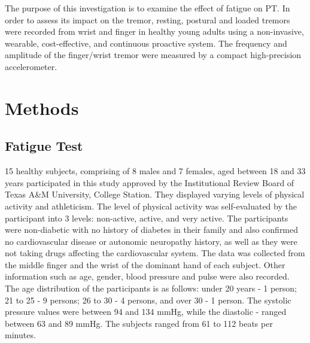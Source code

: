 \documentclass[conference, a4paper]{IEEEtran}
\begin{document}
The purpose of this investigation is to examine the effect of fatigue on PT. In order to assess its impact on the tremor, resting, postural and loaded tremors were  recorded from wrist and finger in healthy young adults using a non-invasive, wearable, cost-effective, and continuous proactive system. The frequency and amplitude of the finger/wrist tremor were measured by a compact high-precision accelerometer.

\section{Methods}
%
\subsection{Fatigue Test}


15 healthy subjects, comprising of 8 males and 7 females, aged between 18 and 33 years participated in this study approved by the Institutional Review Board of Texas A\&M University, College Station. They displayed varying levels of physical activity and athleticism. The level of physical activity was self-evaluated by the participant into 3 levels: non-active, active, and very active. The participants were non-diabetic with no history of diabetes in their family and also confirmed no cardiovascular disease or autonomic neuropathy history, as well as they were not taking drugs affecting the cardiovascular system. The data was collected from the middle finger and the wrist of the dominant hand of each subject. Other information such as age, gender, blood pressure and pulse were also recorded. The age distribution of the participants is as follows: under 20 years - 1 person; 21 to 25 - 9 persons; 26 to 30 - 4 persons, and over 30 - 1 person. The systolic pressure values were between 94 and 134 mmHg, while the diastolic - ranged between 63 and 89 mmHg. The subjects ranged from 61 to 112 beats per minutes.
\end{document}
